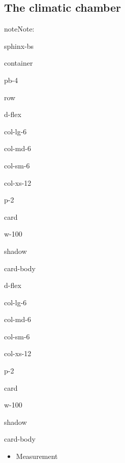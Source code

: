 \documentclass[letterpaper,10pt,english]{jupyterBook}
\begin{document}
\subsection{The climatic chamber}
\label{\detokenize{06_Starting_An_instance:the-climatic-chamber}}
\begin{sphinxadmonition}{note}{Note:}
\sphinxAtStartPar
{}

\begin{sphinxuseclass}{sphinx-bs}
\begin{sphinxuseclass}{container}
\begin{sphinxuseclass}{pb-4}
\begin{sphinxuseclass}{row}
\begin{sphinxuseclass}{d-flex}
\begin{sphinxuseclass}{col-lg-6}
\begin{sphinxuseclass}{col-md-6}
\begin{sphinxuseclass}{col-sm-6}
\begin{sphinxuseclass}{col-xs-12}
\begin{sphinxuseclass}{p-2}
\begin{sphinxuseclass}{card}
\begin{sphinxuseclass}{w-100}
\begin{sphinxuseclass}{shadow}
\begin{sphinxuseclass}{card-body}
\sphinxAtStartPar
{}

\end{sphinxuseclass}
\end{sphinxuseclass}
\end{sphinxuseclass}
\end{sphinxuseclass}
\end{sphinxuseclass}
\end{sphinxuseclass}
\end{sphinxuseclass}
\end{sphinxuseclass}
\end{sphinxuseclass}
\end{sphinxuseclass}
\begin{sphinxuseclass}{d-flex}
\begin{sphinxuseclass}{col-lg-6}
\begin{sphinxuseclass}{col-md-6}
\begin{sphinxuseclass}{col-sm-6}
\begin{sphinxuseclass}{col-xs-12}
\begin{sphinxuseclass}{p-2}
\begin{sphinxuseclass}{card}
\begin{sphinxuseclass}{w-100}
\begin{sphinxuseclass}{shadow}
\begin{sphinxuseclass}{card-body}\begin{itemize}
\item {} 
\sphinxAtStartPar
Measurement


\end{itemize}
\end{sphinxuseclass}
\end{sphinxuseclass}
\end{sphinxuseclass}
\end{sphinxuseclass}
\end{sphinxuseclass}
\end{sphinxuseclass}
\end{sphinxuseclass}
\end{sphinxuseclass}
\end{sphinxuseclass}
\end{sphinxuseclass}
\end{sphinxuseclass}
\end{sphinxuseclass}
\end{sphinxuseclass}
\end{sphinxuseclass}
\end{sphinxadmonition}
\end{document}
